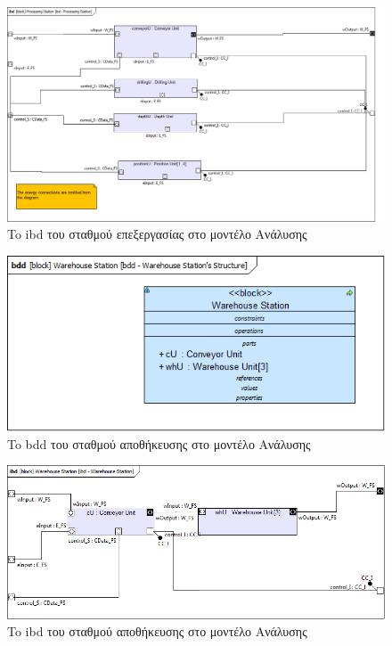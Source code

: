 \documentclass[a4paper,12pt,twoside]{report}
\begin{document}
\begin{appendices}
			\begin{figure}[hp]
					\centering
					\includegraphics[scale=0.30]{AnalysisModel_ibd-ProcessingStation.png}
					\caption{To ibd του σταθμού επεξεργασίας στο μοντέλο Ανάλυσης}
					\label{φωτ:To ibd του σταθμού επεξεργασίας στο μοντέλο Ανάλυσης}
			\end{figure}
			
			\begin{figure}[hp]
					\centering
					\includegraphics[scale=0.50]{AnalysisModel_bdd-WarehouseStationsStructure.png}
					\caption{To bdd του σταθμού αποθήκευσης στο μοντέλο Ανάλυσης}
					\label{φωτ:To bdd του σταθμού αποθήκευσης στο μοντέλο Ανάλυσης}
			\end{figure}
			
			\clearpage
			\begin{figure}[hp]
					\centering
					\includegraphics[scale=0.50]{AnalysisModel_ibd-WarehouseStation.png}
					\caption{To ibd του σταθμού αποθήκευσης στο μοντέλο Ανάλυσης}
					\label{φωτ:To ibd του σταθμού αποθήκευσης στο μοντέλο Ανάλυσης}
			\end{figure}
			

\end{appendices}
\end{document}
